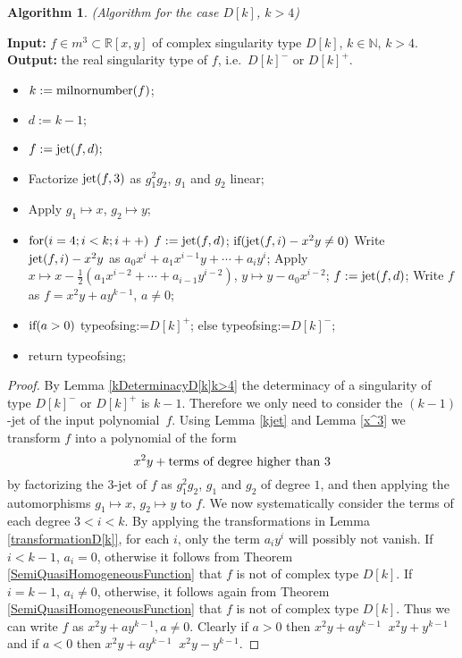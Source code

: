 \documentclass{amsproc}
\DeclareMathOperator{\requiv}{\overset{r}{\sim}}
\begin{document}
\newtheorem{D[k]k>4}[kjet]{Algorithm}
\begin{D[k]k>4}(Algorithm for the case $D[k]$, $k>4$)
\end{D[k]k>4}
\noindent\textnormal{\bf Input:} $f\in m^3\subset\mathbb R[x,y]$ of complex singularity type $D[k]$, $k\in\mathbb N$, $k>4$.\newline
\textnormal{\bf Output:} the real singularity type of $f$, i.e.~$D[k]^-$ or $D[k]^+$.
\begin{itemize}
\item $k:= \textnormal{milnornumber}(f)$;
\item $d:=k-1;$
\item $f:=\textnormal{jet}(f,d);$
\item Factorize $\textnormal{jet}(f,3)$ as $g_1^2g_2$, $g_1$ and $g_2$ linear;
\item Apply $g_1\mapsto x$, $g_2\mapsto y$;
\item $\textnormal{for}(i=4;i<k;i++)$\newline
\phantom{}\quad $f:=\textnormal{jet}(f,d)$;\newline
\phantom{}\quad $\textnormal{if}(\textnormal{jet}(f,i)-x^2y\neq0)$\newline
\phantom{}\quad\quad Write $\textnormal{jet}(f,i)-x^2y$ as $a_0x^i+a_1x^{i-1}y+\cdots +a_iy^i$;\newline
\phantom{}\quad\quad Apply $x\mapsto x-\frac{1}{2}(a_1x^{i-2}+\cdots +a_{i-1}y^{i-2})$, $y\mapsto y-a_0x^{i-2}$;\newline
\phantom{}\quad $f:=\textnormal{jet}(f,d)$;\newline
\phantom{}\quad Write $f$ as $f=x^2y+ay^{k-1}$, $a\neq 0$;
\item $\textnormal{if}(a>0)$\newline
\phantom{}\quad typeofsing:=$D[k]^+$;\newline
else\newline
\phantom{}\quad typeofsing:=$D[k]^-$;
\item return typeofsing;
\end{itemize}
\begin{proof}
By Lemma \ref{kDeterminacyD[k]k>4} the determinacy of a singularity of type
$D[k]^-$ or $D[k]^+$ is $k-1$. Therefore we only need to consider the
$(k-1)$-jet of the input polynomial~$f$. Using Lemma \ref{kjet} and Lemma
\ref{x^3} we transform $f$ into a polynomial of the form
\[x^2y+\textnormal{terms of degree higher than $3$}\]
by factorizing the $3$-jet of $f$ as $g_1^2g_2$, $g_1$ and $g_2$ of degree $1$,
and then applying the automorphisms $g_1\mapsto x$, $g_2\mapsto y$ to $f$. We
now systematically consider the terms of each degree $3<i<k$. By applying the
transformations in Lemma \ref{transformationD[k]}, for each $i$, only the term
$a_iy^i$ will possibly not vanish. If $i<k-1$, $a_i=0$, otherwise it follows
from Theorem \ref{SemiQuasiHomogeneousFunction} that $f$ is not of complex type
$D[k]$. If $i=k-1$, $a_i\neq 0$, otherwise, it follows again from Theorem
\ref{SemiQuasiHomogeneousFunction} that $f$ is not of complex type $D[k]$. Thus
we can write $f$ as $x^2y+ay^{k-1}, a\neq0$. Clearly if $a>0$ then
$x^2y+ay^{k-1}\requiv x^2y+y^{k-1}$ and if $a<0$ then $x^2y+ay^{k-1}\requiv x^2y-y^{k-1}$.
\end{proof}
\end{document}
